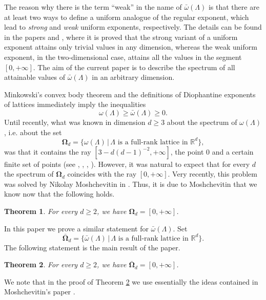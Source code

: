 \documentclass[a4paper,12pt]{article}
\theoremstyle{definition}
\theoremstyle{remark}
\theoremstyle{plain}
\newtheorem{theorem}{Theorem}
\renewcommand{\geq}{\geqslant}
\newcommand{\R}{\mathbb{R}}
\newcommand{\La}{\Lambda}
\begin{document}
The reason why there is the term ``weak'' in the name of $\bar\omega(\La)$ is that there are at least two ways to define a uniform analogue of the regular exponent, which lead to \emph{strong} and \emph{weak} uniform exponents, respectively. The details can be found in the papers \cite{german_comm_math_2023} and \cite{german_sbornik_2026}, where it is proved that the strong variant of a uniform exponent attains only trivial values in any dimension, whereas the weak uniform exponent, in the two-dimensional case, attains all the values in the segment $[0,+\infty]$. The aim of the current paper is to describe the spectrum of all attainable values of $\bar\omega(\La)$ in an arbitrary dimension.

Minkowski's convex body theorem and the definitions of Diophantine exponents of lattices immediately imply the inequalities
\[
  \omega(\La)\geq
  \bar\omega(\La)\geq0.
\]
Until recently, what was known in dimension $d\geq3$ about the spectrum of $\omega(\La)$, i.e. about the set
\[
  \pmb\Omega_d=
  \Big\{ \omega(\La) \,\Big|\, \text{$\La$ is a full-rank lattice in $\R^d$} \Big\},
\]
was that it contains the ray $[3-d(d-1)^{-2},+\infty]$, the point $0$ and a certain finite set of points (see \cite{german_lattice_exponents_izv_2020}, \cite{german_lattice_transference}, \cite{german_monatshefte_2022}, \cite{german_UMN_2023}).
However, it was natural to expect that for every $d$ the spectrum of $\pmb\Omega_d$ coincides with the ray $[0,+\infty]$. Very recently, this problem was solved by Nikolay Moshchevitin in \cite{moshchevitin_lattice_spectrum}. Thus, it is due to Moshchevitin that we know now that the following holds.

\begin{theorem}\label{t:spectrum_of_the_regular_arbitrary_d}
  For every $d\geq2$, we have $\pmb\Omega_d=[0,+\infty]$.
\end{theorem}

In this paper we prove a similar statement for $\bar\omega(\La)$. Set
\[
  \pmb{\bar\Omega}_d=
  \Big\{ \bar\omega(\La) \,\Big|\, \text{$\La$ is a full-rank lattice in $\R^d$} \Big\}.
\]
The following statement is the main result of the paper.

\begin{theorem}\label{t:spectrum_of_the_weak_arbitrary_d}
  For every $d\geq2$, we have $\pmb{\bar\Omega}_d=[0,+\infty]$.
\end{theorem}

We note that in the proof of Theorem \ref{t:spectrum_of_the_weak_arbitrary_d} we use essentially the ideas contained in Moshchevitin's paper \cite{moshchevitin_lattice_spectrum}.
\end{document}
